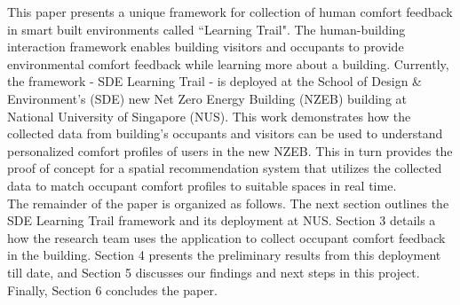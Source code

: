 This paper presents a unique framework for collection of human comfort feedback in smart built environments called ``Learning Trail". The human-building interaction framework enables building visitors and occupants to provide environmental comfort feedback while learning more about a building. Currently, the framework - SDE Learning Trail - is deployed at the School of Design \& Environment's (SDE) new Net Zero Energy Building (NZEB) building at National University of Singapore (NUS). %
This work demonstrates how the collected data from building's occupants and visitors can be used to understand personalized comfort profiles of users in the new NZEB. This in turn provides the proof of concept for a spatial recommendation system that utilizes the collected data to match occupant comfort profiles to suitable spaces in real time.\\

The remainder of the paper is organized as follows. The next section outlines the SDE Learning Trail framework and its deployment at NUS. Section 3 details a how the research team uses the application to collect occupant comfort feedback in the building. Section 4 presents the preliminary results from this deployment till date, and Section 5 discusses our findings and next steps in this project. Finally, Section 6 concludes the paper. 








